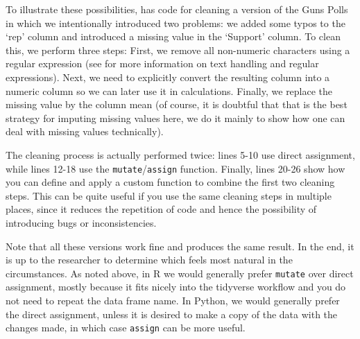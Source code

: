 

To illustrate these possibilities,  has code for cleaning a version of the Guns Polls
in which we intentionally introduced two problems: we added some typos to the `rep' column
and introduced a missing value in the `Support' column.
To clean this, we perform three steps: First, we remove all non-numeric characters using a regular expression
(see  for more information on text handling and regular expressions).
Next, we need to explicitly convert the resulting column into a numeric column so we can later use it in calculations.
Finally, we replace the missing value by the column mean
(of course, it is doubtful that that is the best strategy for imputing missing values here,
we do it mainly to show how one can deal with missing values technically).

The cleaning process is actually performed twice: lines 5-10 use direct assignment,
while lines 12-18 use the \verb+mutate+/\verb+assign+ function.
Finally, lines 20-26 show how you can define and apply a custom function to combine the first two cleaning steps.
This can be quite useful if you use the same cleaning steps in multiple places,
since it reduces the repetition of code and hence the possibility of introducing bugs or inconsistencies. 

Note that all these versions work fine and produces the same result.
In the end, it is up to the researcher to determine which feels most natural in the circumstances.
As noted above, in R we would generally prefer \verb+mutate+ over direct assignment,
mostly because it fits nicely into the tidyverse workflow and you do not need to repeat the data frame name.
In Python, we would generally prefer the direct assignment, unless it is desired to make a copy of the data
with the changes made, in which case \verb+assign+ can be more useful. 



